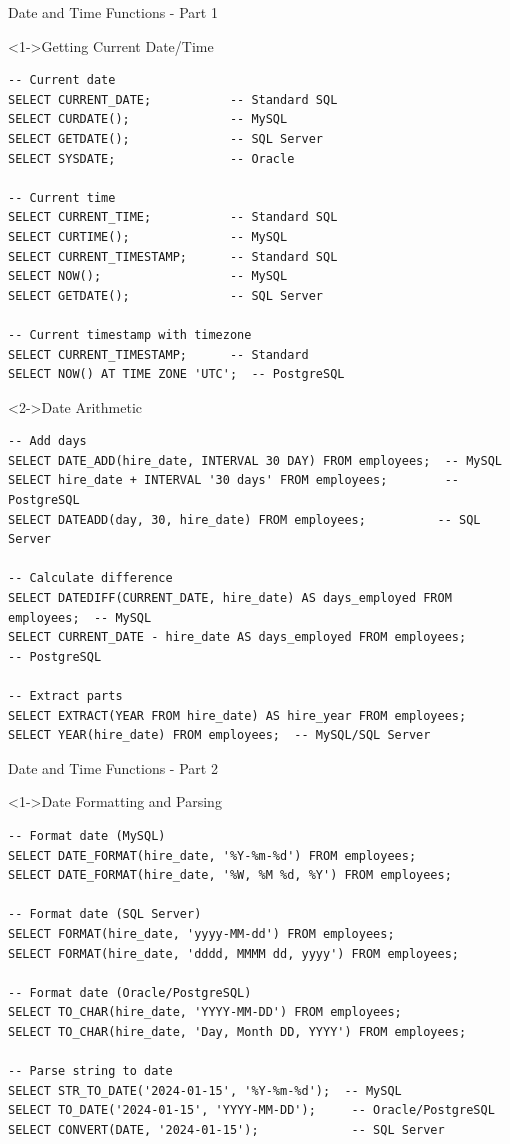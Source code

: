 \documentclass[aspectratio=169,11pt]{beamer}
\begin{document}
\begin{frame}[fragile]{Date and Time Functions - Part 1}
\begin{exampleblock}<1->{Getting Current Date/Time}
\begin{lstlisting}
-- Current date
SELECT CURRENT_DATE;           -- Standard SQL
SELECT CURDATE();              -- MySQL
SELECT GETDATE();              -- SQL Server
SELECT SYSDATE;                -- Oracle

-- Current time
SELECT CURRENT_TIME;           -- Standard SQL
SELECT CURTIME();              -- MySQL
SELECT CURRENT_TIMESTAMP;      -- Standard SQL
SELECT NOW();                  -- MySQL
SELECT GETDATE();              -- SQL Server

-- Current timestamp with timezone
SELECT CURRENT_TIMESTAMP;      -- Standard
SELECT NOW() AT TIME ZONE 'UTC';  -- PostgreSQL
\end{lstlisting}
\end{exampleblock}

\pause
\begin{exampleblock}<2->{Date Arithmetic}
\begin{lstlisting}
-- Add days
SELECT DATE_ADD(hire_date, INTERVAL 30 DAY) FROM employees;  -- MySQL
SELECT hire_date + INTERVAL '30 days' FROM employees;        -- PostgreSQL
SELECT DATEADD(day, 30, hire_date) FROM employees;          -- SQL Server

-- Calculate difference
SELECT DATEDIFF(CURRENT_DATE, hire_date) AS days_employed FROM employees;  -- MySQL
SELECT CURRENT_DATE - hire_date AS days_employed FROM employees;           -- PostgreSQL

-- Extract parts
SELECT EXTRACT(YEAR FROM hire_date) AS hire_year FROM employees;
SELECT YEAR(hire_date) FROM employees;  -- MySQL/SQL Server
\end{lstlisting}
\end{exampleblock}
\end{frame}

\begin{frame}[fragile]{Date and Time Functions - Part 2}
\begin{exampleblock}<1->{Date Formatting and Parsing}
\begin{lstlisting}
-- Format date (MySQL)
SELECT DATE_FORMAT(hire_date, '%Y-%m-%d') FROM employees;
SELECT DATE_FORMAT(hire_date, '%W, %M %d, %Y') FROM employees;

-- Format date (SQL Server)
SELECT FORMAT(hire_date, 'yyyy-MM-dd') FROM employees;
SELECT FORMAT(hire_date, 'dddd, MMMM dd, yyyy') FROM employees;

-- Format date (Oracle/PostgreSQL)
SELECT TO_CHAR(hire_date, 'YYYY-MM-DD') FROM employees;
SELECT TO_CHAR(hire_date, 'Day, Month DD, YYYY') FROM employees;

-- Parse string to date
SELECT STR_TO_DATE('2024-01-15', '%Y-%m-%d');  -- MySQL
SELECT TO_DATE('2024-01-15', 'YYYY-MM-DD');     -- Oracle/PostgreSQL
SELECT CONVERT(DATE, '2024-01-15');             -- SQL Server
\end{lstlisting}
\end{exampleblock}
\end{frame}
\end{document}
